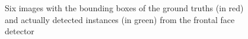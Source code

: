 \documentclass[twocolumn, 10pt, a4paper]{article}
\begin{document}
\begin{figure}[htbp]
  \centering
  \hfill
  \hfill
  \caption{Six images with the bounding boxes of the ground truths (in red) and actually detected instances (in green) from the frontal face detector}\label{fig:face}
\end{figure}
\end{document}
